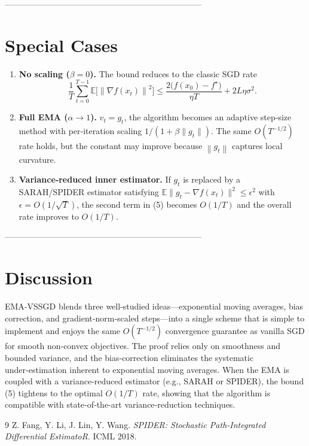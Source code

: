 \documentclass{article}
\newcommand{\E}{\mathbb{E}}
\newcommand{\norm}[1]{\left\|#1\right\|}
\newcommand{\grad}{\nabla}
\begin{document}
-----------------------------------------------------------------------

\section*{Special Cases}
\begin{enumerate}[label=(\alph*)]
    \item \textbf{No scaling ($\beta=0$).}  
    The bound reduces to the classic SGD rate
    \[
    \frac{1}{T}\sum_{t=0}^{T-1}\E\!\bigl[\norm{\grad f(x_{t})}^{2}\bigr]
    \le \frac{2\bigl(f(x_{0})-f^{\star}\bigr)}{\eta T}+2L\eta\sigma^{2}.
    \]
    \item \textbf{Full EMA ($\alpha\to1$).}  
    $\hat v_{t}=g_{t}$, the algorithm becomes an adaptive step‑size method with per‑iteration scaling $1/(1+\beta\|g_{t}\|)$. The same $O(T^{-1/2})$ rate holds, but the constant may improve because $\norm{g_{t}}$ captures local curvature.
    \item \textbf{Variance‑reduced inner estimator.}  
    If $g_{t}$ is replaced by a SARAH/SPIDER estimator satisfying $\E\|g_{t}-\grad f(x_{t})\|^{2}\le \epsilon^{2}$ with $\epsilon=O(1/\sqrt{T})$, the second term in (5) becomes $O(1/T)$ and the overall rate improves to $O(1/T)$.
\end{enumerate}

-----------------------------------------------------------------------

\section*{Discussion}
EMA‑VSSGD blends three well‑studied ideas—exponential moving averages, bias correction, and gradient‑norm‑scaled steps—into a single scheme that is simple to implement and enjoys the same $O(T^{-1/2})$ convergence guarantee as vanilla SGD for smooth non‑convex objectives. The proof relies only on smoothness and bounded variance, and the bias‑correction eliminates the systematic under‑estimation inherent to exponential moving averages. When the EMA is coupled with a variance‑reduced estimator (e.g., SARAH or SPIDER), the bound (5) tightens to the optimal $O(1/T)$ rate, showing that the algorithm is compatible with state‑of‑the‑art variance‑reduction techniques.


\begin{thebibliography}{9}
Z. Fang, Y. Li, J. Lin, Y. Wang. \textit{SPIDER: Stochastic Path‑Integrated Differential EstimatoR}. ICML 2018.
\end{thebibliography}
\end{document}
